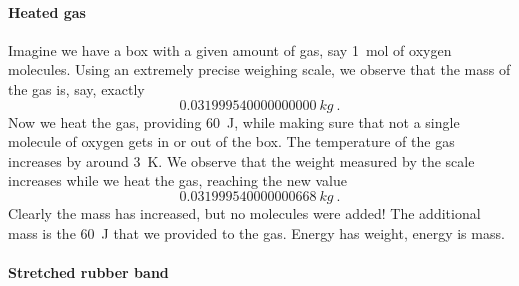 \documentclass[a4paper,12pt,%
onecolumn,oneside,titlepage,%
british%
]{memoir}
\renewcommand*{\|}[1][]{\nonscript\:#1\vert\nonscript\:\mathopen{}}
\begin{document}
\paragraph{Heated gas}

Imagine we have a box with a given amount of gas, say \qty{1}{mol} of oxygen molecules. Using an extremely precise weighing scale, we observe that the mass of the gas is, say, exactly
\begin{equation*}
  \qty{0.031999540000000000}{kg} \ .
\end{equation*}
Now we heat the gas, providing \qty{60}{J}, while making sure that not a single molecule of oxygen gets in or out of the box. The temperature of the gas increases by around \qty{3}{K}. We observe that the weight measured by the scale increases while we heat the gas, reaching the new value
\begin{equation*}
  \qty{0.031999540000000668}{kg} \ .
\end{equation*}
Clearly the mass has increased, but no molecules were added! The additional mass is the \qty{60}{J} that we provided to the gas. Energy has weight, energy is mass.


\paragraph{Stretched rubber band}
\end{document}
